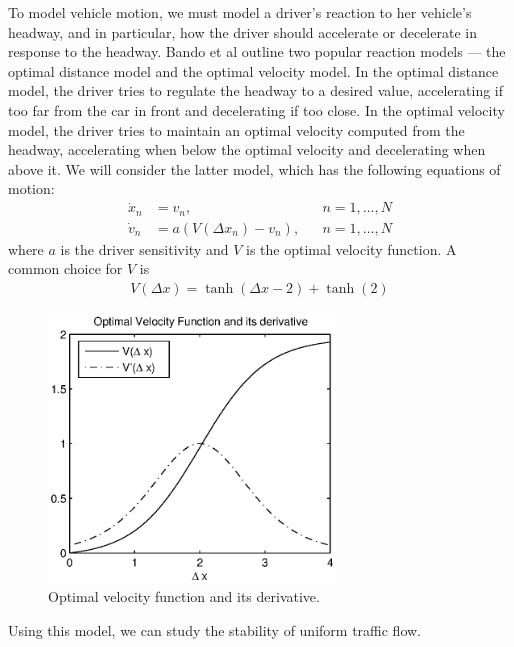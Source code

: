 \documentclass[10pt,twocolumn]{article}
\theoremstyle{ss}
\newcommand{\lm}{\fontfamily{\sfdefault}\selectfont}
\begin{document}
To model vehicle motion, we must model a driver's reaction to her vehicle's headway, and in particular, how the driver should accelerate or decelerate in response to the headway. Bando et al \cite{Bando} outline two popular reaction models --- the optimal distance model and the optimal velocity model. In the optimal distance model, the driver tries to regulate the headway to a desired value, accelerating if too far from the car in front and decelerating if too close. In the optimal velocity model, the driver tries to maintain an optimal velocity computed from the headway, accelerating when below the optimal velocity and decelerating when above it. We will consider the latter model, which has the following equations of motion:
\begin{align}
\label{ovm1} \dot{x}_n &= v_n,& &n=1,\dots,N\\
\label{ovm2} \dot{v}_n &= a\left(V(\Delta x_n) - v_n\right),& &n=1,\dots,N
\end{align}
where $a$ is the driver sensitivity and $V$ is the optimal velocity function. A common choice for $V$ \cite{Bando} is
\begin{gather*}
V(\Delta x)=\tanh(\Delta x - 2) + \tanh(2)
\end{gather*}

\begin{figure}[!h]
\lm
\begin{center}
\includegraphics[width=3in]{vopt}
\end{center}
\caption{\label{fig:vopt} Optimal velocity function and its derivative.}
\end{figure}

Using this model, we can study the stability of uniform traffic flow.
\end{document}
